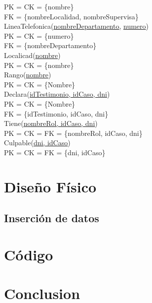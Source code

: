 \documentclass[10pt,a4paper]{article}
\begin{document}
	PK = CK = \{nombre\}\\ 
	FK = \{nombreLocalidad, nombreSupervisa\}\\
\newline
LineaTelefonica(\underline{\underline{nombreDepartamento}}, \underline{numero})\\ 
	PK = CK = \{numero\}\\ 
	FK = \{nombreDepartamento\}\\
\newline
Localicad(\underline{nombre})\\ 
	PK = CK = \{nombre\}\\ 
\newline
Rango(\underline{nombre})\\ 
	PK = CK = \{Nombre\}\\ 
\newline
Declara(\underline{\underline{idTestimonio, idCaso, dni}})\\ 
	PK = CK = \{Nombre\}\\ 
	FK = \{idTestimonio, idCaso, dni\}\\
\newline
Tiene(\underline{\underline{nombreRol, idCaso, dni}})\\ 
	PK = CK = FK = \{nombreRol, idCaso, dni\}\\ 
\newline
Culpable(\underline{\underline{dni, idCaso}})\\ 
	PK = CK = FK = \{dni, idCaso\}\\ 

\section{Diseño Físico}

\subsection{Inserción de datos}

\section{Código}

\section{Conclusion}
\end{document}
